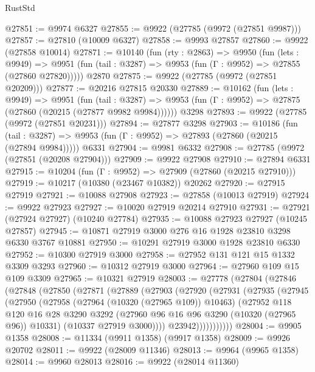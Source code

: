 \begin{lexlean}{RustStd}
\begin{coremodule}
@27851 := @9974 @6327
@27855 := @9922 (@27785 (@9972 (@27851 @9987)))
@27857 := @27810 (@10009 @6327)
@27858 := @9993 @27857
@27860 := @9922 (@27858 @10014)
@27871 := @10140
    (fun (rty : @2863) =>
    @9950
      (fun (lets : @9949) =>
      @9951 (fun (tail : @3287) => @9953 (fun (Γ : @9952) => @27855 (@27860 @27820)))))
    @2870
@27875 := @9922 (@27785 (@9972 (@27851 @20209)))
@27877 := @20216 @27815 @20330
@27889 := @10162
    (fun (lets : @9949) =>
    @9951
      (fun (tail : @3287) =>
      @9953 (fun (Γ : @9952) => @27875 (@27860 (@20215 (@27877 @9982 @9984))))))
    @3298
@27893 := @9922 (@27785 (@9972 (@27851 @20231)))
@27894 := @27877 @3298
@27903 := @10186
    (fun (tail : @3287) => @9953 (fun (Γ : @9952) => @27893 (@27860 (@20215 (@27894 @9984)))))
    @6331
@27904 := @9981 @6332
@27908 := @27785 (@9972 (@27851 (@20208 @27904)))
@27909 := @9922 @27908
@27910 := @27894 @6331
@27915 := @10204 (fun (Γ : @9952) => @27909 (@27860 (@20215 @27910)))
@27919 := @10217 (@10380 (@23467 @10382)) @20262
@27920 := @27915 @27919
@27921 := @10088 @27908
@27923 := @27858 (@10013 @27919)
@27924 := @9922 @27923
@27927 := @10020 @27919 @20214 @27910
@27931 := @27921 (@27924 @27927) (@10240 @27784)
@27935 := @10088 @27923 @27927 (@10245 @27857)
@27945 := @10871 @27919 @3000 @276 @16 @1928 @23810 @3298 @6330 @3767 @10881
@27950 := @10291 @27919 @3000 @1928 @23810 @6330
@27952 := @10300 @27919 @3000
@27958 := @27952 @131 @121 @15 @1332 @3309 @3293
@27960 := @10312 @27919 @3000
@27964 := @27960 @109 @15 @109 @3309
@27965 := @10321 @27919
@28003 := @27778
    (@27804
      (@27846
        (@27848
          (@27850
            (@27871
              (@27889
                (@27903
                  (@27920
                    (@27931
                      (@27935
                        (@27945
                          (@27950
                            (@27958
                              (@27964 (@10320 (@27965 @109)) @10463)
                              (@27952
                                @118
                                @120
                                @16
                                @28
                                @3290
                                @3292
                                (@27960 @96 @16 @96 @3290 (@10320 (@27965 @96)) @10331)
                                (@10337 @27919 @3000))))
                          @23942)))))))))))
@28004 := @9905 @1358
@28008 := @11334 (@9911 @1358) (@9917 @1358)
@28009 := @9926 @20702
@28011 := @9922 (@28009 @11346)
@28013 := @9964 (@9965 @1358)
@28014 := @9960 @28013
@28016 := @9922 (@28014 @11360)

\end{coremodule}
\end{lexlean}
